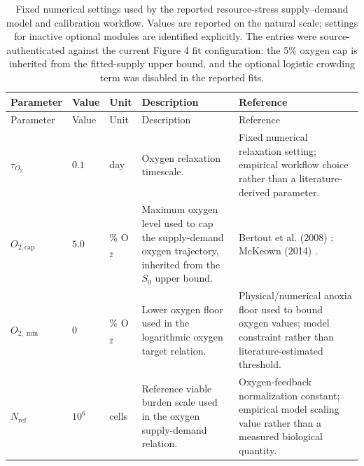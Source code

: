 \begingroup
\scriptsize
\setlength{\tabcolsep}{3pt}
\setlength\LTleft{0pt}
\setlength\LTright{0pt}
\newlength{\FixedParamTableWidth}
\setlength{\FixedParamTableWidth}{\dimexpr\textwidth-8\tabcolsep\relax}
\begin{longtable}{@{}>{\raggedright\arraybackslash}p{0.11\FixedParamTableWidth}>{\raggedright\arraybackslash}p{0.06\FixedParamTableWidth}>{\raggedright\arraybackslash}p{0.10\FixedParamTableWidth}>{\raggedright\arraybackslash}p{0.48\FixedParamTableWidth}>{\raggedright\arraybackslash}p{0.25\FixedParamTableWidth}@{}}
\caption{Fixed numerical settings used by the reported resource-stress supply--demand model and calibration workflow. Values are reported on the natural scale; settings for inactive optional modules are identified explicitly. The entries were source-authenticated against the current Figure 4 fit configuration: the 5\% oxygen cap is inherited from the fitted-supply upper bound, and the optional logistic crowding term was disabled in the reported fits.}
\label{tab:model_fixed_parameters}\\

\toprule
Parameter & Value & Unit & Description & Reference \\
\midrule
\endfirsthead

\toprule
Parameter & Value & Unit & Description & Reference \\
\midrule
\endhead

$\tau_{O_2}$ & $0.1$ & day & Oxygen relaxation timescale. & Fixed numerical relaxation setting; empirical workflow choice rather than a literature-derived parameter. \\

$O_{2,\mathrm{cap}}$ & $5.0$ & \% O$_2$ & Maximum oxygen level used to cap the supply-demand oxygen trajectory, inherited from the $S_0$ upper bound. & Bertout et al. (2008) \cite{bertout_impact_2008}; McKeown (2014) \cite{mckeown_defining_2014}. \\

$O_{2,\min}$ & $0$ & \% O$_2$ & Lower oxygen floor used in the logarithmic oxygen target relation. & Physical/numerical anoxia floor used to bound oxygen values; model constraint rather than literature-estimated threshold. \\

$N_{\mathrm{ref}}$ & $10^{6}$ & cells & Reference viable burden scale used in the oxygen supply-demand relation. & Oxygen-feedback normalization constant; empirical model scaling value rather than a measured biological quantity. \\


\end{longtable}
